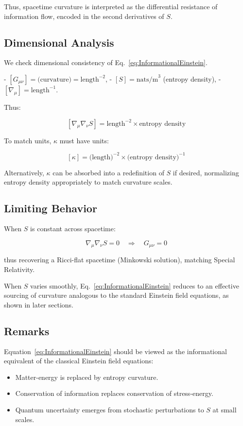\documentclass{article}
\begin{document}
Thus, spacetime curvature is interpreted as the differential resistance of information flow, encoded in the second derivatives of $S$.

\subsection{Dimensional Analysis}

We check dimensional consistency of Eq.~\eqref{eq:InformationalEinstein}.

- $[G_{\mu\nu}] = \text{(curvature)} = \text{length}^{-2}$,
- $[S] = \text{nats/m}^3$ (entropy density),
- $[\nabla_\mu] = \text{length}^{-1}$.

Thus:

\[
[\nabla_\mu \nabla_\nu S] = \text{length}^{-2} \times \text{entropy density}
\]

To match units, $\kappa$ must have units:

\[
[\kappa] = \text{(length)}^{-2} \times \text{(entropy density)}^{-1}
\]

Alternatively, $\kappa$ can be absorbed into a redefinition of $S$ if desired, normalizing entropy density appropriately to match curvature scales.

\subsection{Limiting Behavior}

When $S$ is constant across spacetime:

\[
\nabla_\mu \nabla_\nu S = 0
\quad \Rightarrow \quad G_{\mu\nu} = 0
\]

thus recovering a Ricci-flat spacetime (Minkowski solution), matching Special Relativity.

When $S$ varies smoothly, Eq.~\eqref{eq:InformationalEinstein} reduces to an effective sourcing of curvature analogous to the standard Einstein field equations, as shown in later sections.

\subsection{Remarks}

Equation~\eqref{eq:InformationalEinstein} should be viewed as the informational equivalent of the classical Einstein field equations:

\begin{itemize}
    \item Matter-energy is replaced by entropy curvature.
    \item Conservation of information replaces conservation of stress-energy.
    \item Quantum uncertainty emerges from stochastic perturbations to $S$ at small scales.
\end{itemize}
\end{document}
